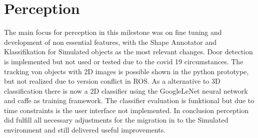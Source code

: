 \documentclass[main.tex]{subfiles}
\begin{document}
	
	\chapter{Perception}
	
The main focus for perception in this milestone was on fine tuning and development of non essential features, with the Shape Annotator and Klassifikation for Simulated objects as the most relevant changes.
Door detection is implemented but not used or tested due to the covid 19 circumstances.
The tracking von objects with 2D images is possible shown in the python prototype, but not realized due to version conflict in ROS.
As a alternative to 3D classification there is now a 2D classifier using the GoogleLeNet neural network and caffe as training framework.
The classifier evaluation is funktional but due to time constraints is the user interface not implemented.
In conclusion perception did fulfill all necessary adjustments for the migration in to the Simulated environment and still delivered useful improvements.

	
\end{document}

